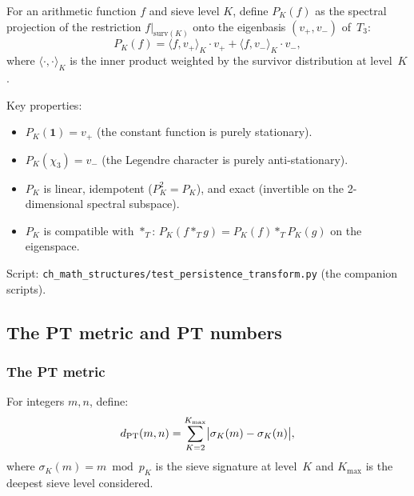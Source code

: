 \documentclass[12pt,a4paper]{article}
\begin{document}
\begin{definition}
\label{def:persistence_transform}
For an arithmetic function $f$ and sieve level $K$, define
$P_K(f)$ as the spectral projection of the restriction
$f|_{\mathrm{surv}(K)}$ onto the eigenbasis $(v_+, v_-)$ of~$T_3$:
\begin{equation}
  P_K(f) = \langle f, v_+ \rangle_K \cdot v_+
          + \langle f, v_- \rangle_K \cdot v_-,
  \label{eq:persistence_transform}
\end{equation}
where $\langle \cdot, \cdot \rangle_K$ is the inner product
weighted by the survivor distribution at level~$K$.
\end{definition}

Key properties:
\begin{itemize}[nosep]
\item $P_K(\mathbf{1}) = v_+$ (the constant function is purely
  stationary).
\item $P_K(\chi_3) = v_-$ (the Legendre character is purely
  anti-stationary).
\item $P_K$ is linear, idempotent ($P_K^2 = P_K$), and exact
  (invertible on the 2-dimensional spectral subspace).
\item $P_K$ is compatible with $*_T$: $P_K(f *_T g) = P_K(f) *_T P_K(g)$
  on the eigenspace.
\end{itemize}

Script: \texttt{ch\_math\_structures/test\_persistence\_transform.py} (the companion scripts).


\subsection{The PT metric and PT numbers}
\label{sec:ms_metric}

\subsubsection{The PT metric}

\begin{definition}[PT distance]
\label{def:pt_metric}
For integers $m, n$, define:
\begin{equation}
  d_{\rm PT}(m, n) = \sum_{K=2}^{K_{\max}}
    \bigl| \sigma_K(m) - \sigma_K(n) \bigr|,
  \label{eq:pt_metric}
\end{equation}
where $\sigma_K(m) = m \bmod p_K$ is the sieve signature at level~$K$
and $K_{\max}$ is the deepest sieve level considered.
\end{definition}
\end{document}
